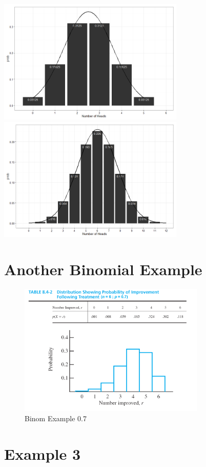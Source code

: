 \documentclass[12pt]{article}
\begin{document}
\includegraphics[width=3.5in]{figure/normapprox-1.png}
\includegraphics[width=3.5in]{figure/normapprox-2.png}

\section{Another Binomial Example}\label{another-binomial-example}

\begin{figure}[H]
\centering
\includegraphics[width=3.5in]{binom_improve.png}
\caption{Binom Example 0.7}
\end{figure}

\section{Example 3}\label{example-3}
\end{document}

